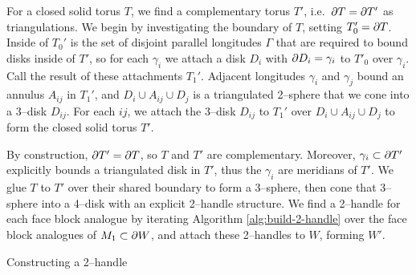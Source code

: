 For a closed solid torus $T$, we find a complementary torus $T'$, i.e.\ $\partial T=\partial T'$ as triangulations.
We begin by investigating the boundary of $T$, setting $T_0'=\partial T$.
Inside of $T_0'$ is the set of disjoint parallel longitudes $\Gamma$ that are required to bound disks inside of $T'$, so for each $\gamma_i$ we attach a disk $D_i$ with $\partial D_i=\gamma_i$ to $T'_0$ over $\gamma_i$.
Call the result of these attachments $T_1'$.
Adjacent longitudes $\gamma_i$ and $\gamma_j$ bound an annulus $A_{ij}$ in $T_1'$, and $D_i \cup A_{ij}\cup D_j$ is a triangulated 2--sphere that we cone into a 3--disk $D_{ij}$.
For each $ij$, we attach the 3--disk $D_{ij}$ to $T_1'$ over $D_i\cup A_{ij}\cup D_j$ to form the closed solid torus $T'$.

By construction, $\partial T'=\partial T$, so $T$ and $T'$ are complementary. Moreover, $\gamma_i\subset \partial T'$ explicitly bounds a triangulated disk in $T'$, thus the $\gamma_i$ are meridians of $T'$.
We glue $T$ to $T'$ over their shared boundary to form a 3--sphere, then cone that 3--sphere into a 4--disk with an explicit 2--handle structure.
We find a 2--handle for each face block analogue by iterating Algorithm \ref{alg:build-2-handle} over the face block analogues of $M_1\subset \partial W$, and attach these 2--handles to $W$, forming $W'$.

\begin{algorithm}[h!]
	\caption{Constructing a 2--handle}
	\label{alg:build-2-handle}
\end{algorithm}

